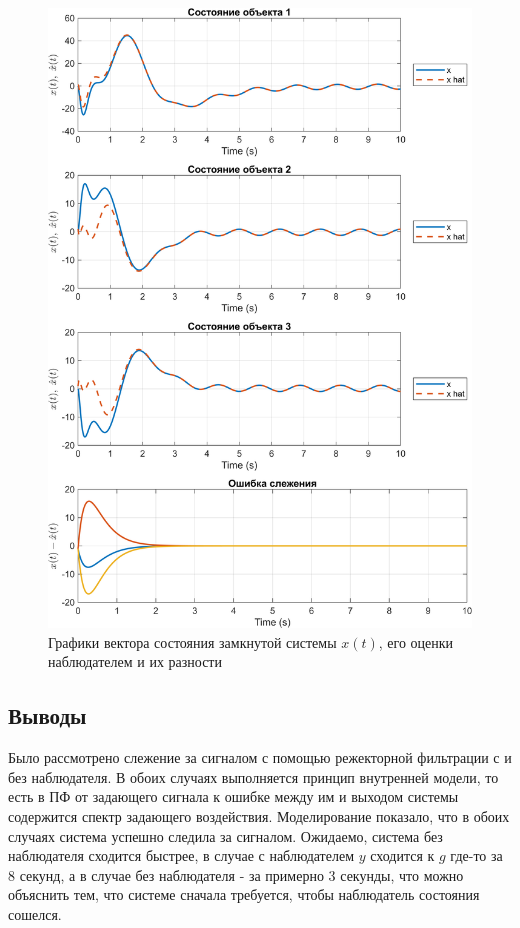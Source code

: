 \begin{figure}[H]
    \centering
    \includegraphics[width=\linewidth]{figs/1_1_1_sim.png}
    \caption{Графики вектора состояния замкнутой системы $x(t)$, его оценки наблюдателем и 
    их разности}
    \label{fig:1_1_1_sim}
\end{figure}


\subsection{Выводы}

Было рассмотрено слежение за сигналом с помощью режекторной фильтрации с и без наблюдателя.
В обоих случаях выполняется принцип внутренней модели, то есть в ПФ от задающего сигнала 
к ошибке между им и выходом системы содержится спектр задающего воздействия. Моделирование показало,
что в обоих случаях система успешно следила за сигналом. Ожидаемо, система без наблюдателя
сходится быстрее, в случае с наблюдателем $y$ сходится к $g$ где-то за 8 секунд, а 
в случае без наблюдателя - за примерно 3 секунды, что можно объяснить тем, что системе сначала
требуется, чтобы наблюдатель состояния сошелся.





